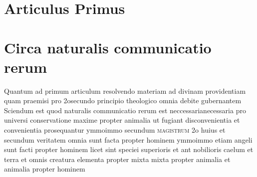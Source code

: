 \documentclass[twoside, openright]{report}
\newcommand{\name}[1]{\textsc{#1}}
\begin{document}
        \bigskip
         \section*{Articulus Primus} 
        \bigskip
         \section*{Circa naturalis communicatio rerum} 
        \pstart
        Quantum ad primum articulum resolvendo materiam ad divinam providentiam quam praemisi pro 2osecundo principio theologico omnia debite gubernantem  Sciendum est quod naturalis communicatio rerum est neccessarianecessaria pro universi conservatione maxime propter animalia ut fugiant disconvenientia et convenientia prosequantur  ymmoimmo secundum \name{magistrum} 2o huius et secundum veritatem omnia sunt facta propter hominem ymmoimmo etiam angeli sunt facti propter hominem licet sint speciei superioris et ant nobilioris caelum et terra et omnis creatura elementa propter mixta mixta propter animalia et animalia propter hominem
        \pend
     
\end{document}
